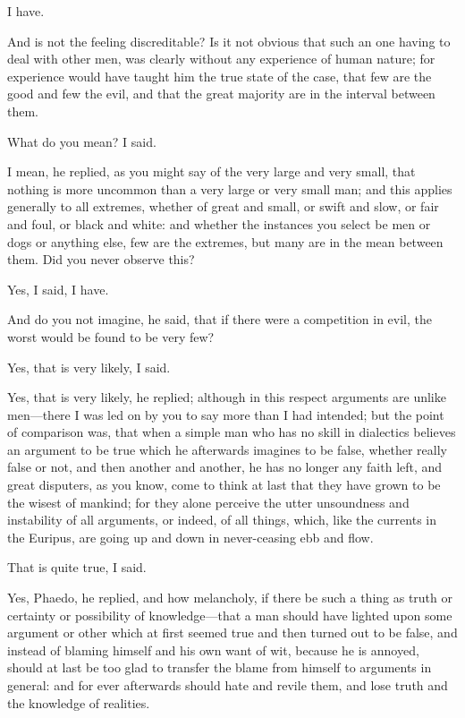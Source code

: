 \documentclass[11pt,letter]{article}
\begin{document}
\par  I have.

\par  And is not the feeling discreditable? Is it not obvious that such an one having to deal with other men, was clearly without any experience of human nature; for experience would have taught him the true state of the case, that few are the good and few the evil, and that the great majority are in the interval between them.

\par  What do you mean? I said.

\par  I mean, he replied, as you might say of the very large and very small, that nothing is more uncommon than a very large or very small man; and this applies generally to all extremes, whether of great and small, or swift and slow, or fair and foul, or black and white: and whether the instances you select be men or dogs or anything else, few are the extremes, but many are in the mean between them. Did you never observe this?

\par  Yes, I said, I have.

\par  And do you not imagine, he said, that if there were a competition in evil, the worst would be found to be very few?

\par  Yes, that is very likely, I said.

\par  Yes, that is very likely, he replied; although in this respect arguments are unlike men—there I was led on by you to say more than I had intended; but the point of comparison was, that when a simple man who has no skill in dialectics believes an argument to be true which he afterwards imagines to be false, whether really false or not, and then another and another, he has no longer any faith left, and great disputers, as you know, come to think at last that they have grown to be the wisest of mankind; for they alone perceive the utter unsoundness and instability of all arguments, or indeed, of all things, which, like the currents in the Euripus, are going up and down in never-ceasing ebb and flow.

\par  That is quite true, I said.

\par  Yes, Phaedo, he replied, and how melancholy, if there be such a thing as truth or certainty or possibility of knowledge—that a man should have lighted upon some argument or other which at first seemed true and then turned out to be false, and instead of blaming himself and his own want of wit, because he is annoyed, should at last be too glad to transfer the blame from himself to arguments in general: and for ever afterwards should hate and revile them, and lose truth and the knowledge of realities.
\end{document}
